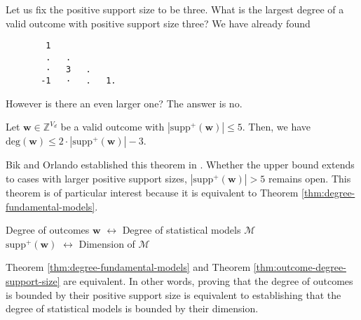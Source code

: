 \begin{example}
    Let us fix the positive support size to be three. What is the largest degree of a valid outcome with positive support size three? We have already found
    \begin{verbatim}
        1  
        .   .     
        ·   3   .    
       -1   ·   .   1.   
    \end{verbatim} 
    However is there an even larger one? The answer is no.
 \end{example}

\begin{theorem}\label{thm:outcome-degree-support-size}
    Let \( \mathbf w \in \mathbb{Z}^{V_d} \) be a valid outcome with \( |\mathrm{supp}^+(\mathbf w)| \leq 5 \). Then, we have \( \mathrm{deg}(\mathbf w) \leq 2 \cdot |\mathrm{supp}^+(\mathbf w)| - 3 \).
\end{theorem}

Bik and Orlando established this theorem in \cite{bik2022classifying}. Whether the upper bound extends to cases with larger positive support sizes, \( |\mathrm{supp}^+(\mathbf w)| > 5 \) remains open. This theorem is of particular interest because it is equivalent to Theorem \ref{thm:degree-fundamental-models}.

\begin{center}
    Degree of outcomes \( \mathbf{w} \) \( \longleftrightarrow \) Degree of statistical models \( \mathcal{M} \) \\
    \( \mathrm{supp}^+(\mathbf w) \) \( \longleftrightarrow \) Dimension of \( \mathcal{M} \)
\end{center}

\begin{proposition}\label{prop:equivalence-degree-support-size}
    Theorem \ref{thm:degree-fundamental-models} and Theorem \ref{thm:outcome-degree-support-size} are equivalent. In other words, proving that the degree of outcomes is bounded by their positive support size is equivalent to establishing that the degree of statistical models is bounded by their dimension.
\end{proposition}

